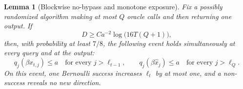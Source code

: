 \documentclass[11pt,a4paper]{article}
\newtheorem{lemma}[theorem]{Lemma}
\theoremstyle{remark}
\begin{document}
\begin{lemma}[Blockwise no-bypass and monotone exposure]
\label{lem:block-no-bypass}
Fix a possibly randomized algorithm making at most $Q$ oracle calls and then
returning one output.  If
\begin{equation}
 D\ge C a^{-2}\log\bigl(16T(Q+1)\bigr),
 \label{eq:block-dimension-choice}
\end{equation}
then, with probability at least $7/8$, the following event holds
simultaneously at every query and at the output:
\begin{equation}
 q_j(\beta x_{t,j})\le a
 \quad\text{for every }j>\ell_{t-1},
 \qquad
 q_j(\beta\widehat x_j)\le a
 \quad\text{for every }j>\ell_Q.
 \label{eq:no-bypass-event}
\end{equation}
On this event, one Bernoulli success increases $\ell_t$ by at most one, and a
non-success reveals no new direction.
\end{lemma}
\end{document}
